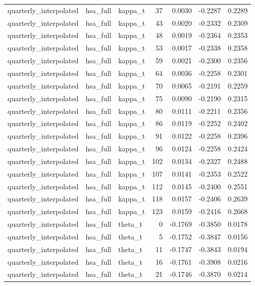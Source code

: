 \begin{tabular}{lllrrrr}
quarterly\_interpolated & hsa\_full & kappa\_t & 37 & 0.0030 & -0.2287 & 0.2289 \\
quarterly\_interpolated & hsa\_full & kappa\_t & 43 & 0.0020 & -0.2332 & 0.2309 \\
quarterly\_interpolated & hsa\_full & kappa\_t & 48 & 0.0019 & -0.2364 & 0.2353 \\
quarterly\_interpolated & hsa\_full & kappa\_t & 53 & 0.0017 & -0.2338 & 0.2358 \\
quarterly\_interpolated & hsa\_full & kappa\_t & 59 & 0.0021 & -0.2300 & 0.2356 \\
quarterly\_interpolated & hsa\_full & kappa\_t & 64 & 0.0036 & -0.2258 & 0.2301 \\
quarterly\_interpolated & hsa\_full & kappa\_t & 70 & 0.0065 & -0.2191 & 0.2259 \\
quarterly\_interpolated & hsa\_full & kappa\_t & 75 & 0.0090 & -0.2190 & 0.2315 \\
quarterly\_interpolated & hsa\_full & kappa\_t & 80 & 0.0111 & -0.2211 & 0.2356 \\
quarterly\_interpolated & hsa\_full & kappa\_t & 86 & 0.0119 & -0.2252 & 0.2402 \\
quarterly\_interpolated & hsa\_full & kappa\_t & 91 & 0.0122 & -0.2258 & 0.2396 \\
quarterly\_interpolated & hsa\_full & kappa\_t & 96 & 0.0124 & -0.2258 & 0.2424 \\
quarterly\_interpolated & hsa\_full & kappa\_t & 102 & 0.0134 & -0.2327 & 0.2488 \\
quarterly\_interpolated & hsa\_full & kappa\_t & 107 & 0.0141 & -0.2353 & 0.2522 \\
quarterly\_interpolated & hsa\_full & kappa\_t & 112 & 0.0145 & -0.2400 & 0.2551 \\
quarterly\_interpolated & hsa\_full & kappa\_t & 118 & 0.0157 & -0.2406 & 0.2639 \\
quarterly\_interpolated & hsa\_full & kappa\_t & 123 & 0.0159 & -0.2416 & 0.2668 \\
quarterly\_interpolated & hsa\_full & theta\_t & 0 & -0.1769 & -0.3850 & 0.0178 \\
quarterly\_interpolated & hsa\_full & theta\_t & 5 & -0.1752 & -0.3847 & 0.0156 \\
quarterly\_interpolated & hsa\_full & theta\_t & 11 & -0.1747 & -0.3843 & 0.0194 \\
quarterly\_interpolated & hsa\_full & theta\_t & 16 & -0.1761 & -0.3908 & 0.0216 \\
quarterly\_interpolated & hsa\_full & theta\_t & 21 & -0.1746 & -0.3870 & 0.0214 \\

\end{tabular}
